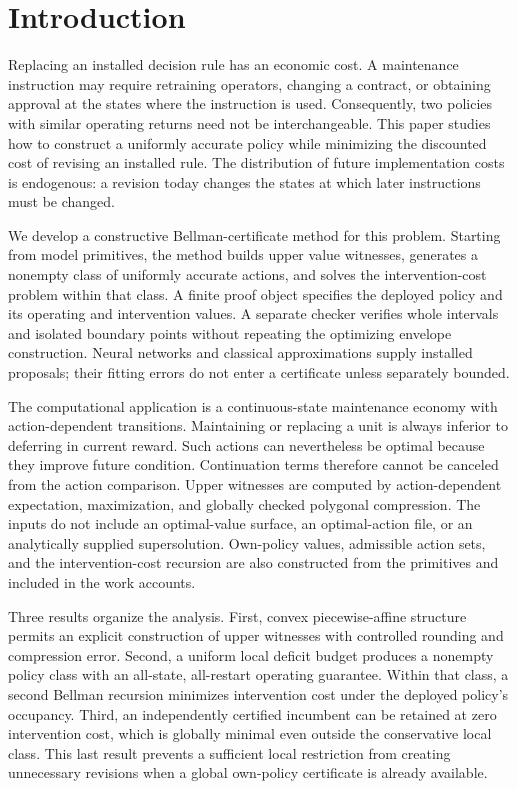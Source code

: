 \section{Introduction}
Replacing an installed decision rule has an economic cost. A maintenance instruction may require retraining operators, changing a contract, or obtaining approval at the states where the instruction is used. Consequently, two policies with similar operating returns need not be interchangeable. This paper studies how to construct a uniformly accurate policy while minimizing the discounted cost of revising an installed rule. The distribution of future implementation costs is endogenous: a revision today changes the states at which later instructions must be changed.

We develop a constructive Bellman-certificate method for this problem. Starting from model primitives, the method builds upper value witnesses, generates a nonempty class of uniformly accurate actions, and solves the intervention-cost problem within that class. A finite proof object specifies the deployed policy and its operating and intervention values. A separate checker verifies whole intervals and isolated boundary points without repeating the optimizing envelope construction. Neural networks and classical approximations supply installed proposals; their fitting errors do not enter a certificate unless separately bounded.

The computational application is a continuous-state maintenance economy with action-dependent transitions. Maintaining or replacing a unit is always inferior to deferring in current reward. Such actions can nevertheless be optimal because they improve future condition. Continuation terms therefore cannot be canceled from the action comparison. Upper witnesses are computed by action-dependent expectation, maximization, and globally checked polygonal compression. The inputs do not include an optimal-value surface, an optimal-action file, or an analytically supplied supersolution. Own-policy values, admissible action sets, and the intervention-cost recursion are also constructed from the primitives and included in the work accounts.

Three results organize the analysis. First, convex piecewise-affine structure permits an explicit construction of upper witnesses with controlled rounding and compression error. Second, a uniform local deficit budget produces a nonempty policy class with an all-state, all-restart operating guarantee. Within that class, a second Bellman recursion minimizes intervention cost under the deployed policy's occupancy. Third, an independently certified incumbent can be retained at zero intervention cost, which is globally minimal even outside the conservative local class. This last result prevents a sufficient local restriction from creating unnecessary revisions when a global own-policy certificate is already available.

